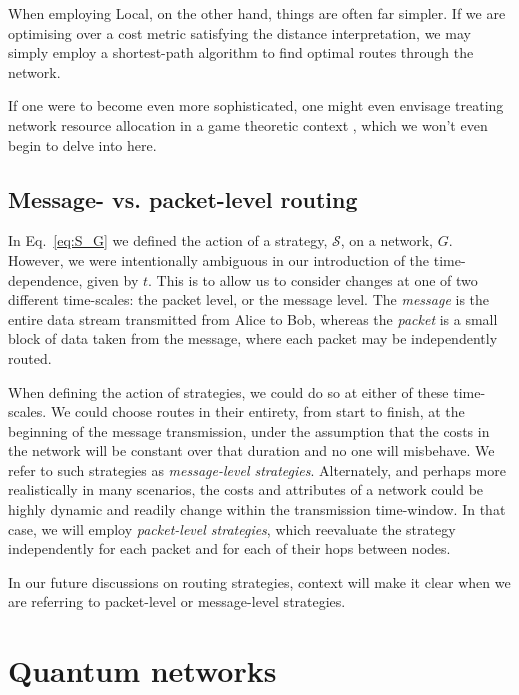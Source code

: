 \documentclass[aps,rmp,twocolumn,amsmath,amssymb,nofootinbib,superscriptaddress,longbibliography,floatfix]{revtex4-1}
\begin{document}
When employing {\sc Local}, on the other hand, things are often far simpler. If we are optimising over a cost metric satisfying the distance interpretation, we may simply employ a shortest-path algorithm to find optimal routes through the network.

If one were to become even more sophisticated, one might even envisage treating network resource allocation in a game theoretic context \cite{???}, which we won't even begin to delve into here.

%
%

\subsection{Message- vs. packet-level routing}

In Eq.~\ref{eq:S_G} we defined the action of a strategy, $\mathcal{S}$, on a network, $G$. However, we were intentionally ambiguous in our introduction of the time-dependence, given by $t$. This is to allow us to consider changes at one of two different time-scales: the packet level, or the message level. The \emph{message} is the entire data stream transmitted from Alice to Bob, whereas the \emph{packet} is a small block of data taken from the message, where each packet may be independently routed.

When defining the action of strategies, we could do so at either of these time-scales. We could choose routes in their entirety, from start to finish, at the beginning of the message transmission, under the assumption that the costs in the network will be constant over that duration and no one will misbehave. We refer to such strategies as \emph{message-level strategies}. Alternately, and perhaps more realistically in many scenarios, the costs and attributes of a network could be highly dynamic and readily change within the transmission time-window. In that case, we will employ \emph{packet-level strategies}, which reevaluate the strategy independently for each packet and for each of their hops between nodes.

In our future discussions on routing strategies, context will make it clear when we are referring to packet-level or message-level strategies.

%
%

\section{Quantum networks} \label{sec:quant_net}
\end{document}
